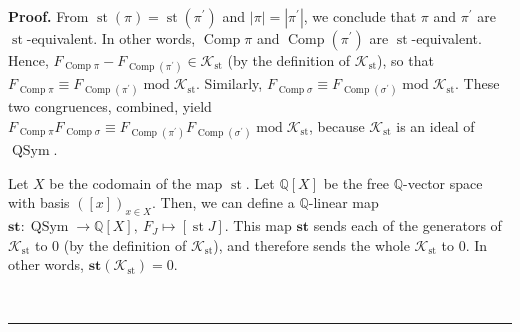\documentclass[numbers=enddot,12pt,final,onecolumn,notitlepage]{scrartcl}%
\theoremstyle{definition}
\newenvironment{proof}[1][Proof]{\noindent\textbf{#1.} }{\ \rule{0.5em}{0.5em}}
\newenvironment{verlong}{}{}
\begin{document}
\begin{verlong}
\begin{proof}
From $\operatorname*{st}\left(  \pi\right)  =\operatorname*{st}\left(
\pi^{\prime}\right)  $ and $\left\vert \pi\right\vert =\left\vert \pi^{\prime
}\right\vert $, we conclude that $\pi$ and $\pi^{\prime}$ are
$\operatorname*{st}$-equivalent. In other words, $\operatorname*{Comp}\pi$ and
$\operatorname*{Comp}\left(  \pi^{\prime}\right)  $ are $\operatorname*{st}%
$-equivalent. Hence, $F_{\operatorname*{Comp}\pi}-F_{\operatorname*{Comp}%
\left(  \pi^{\prime}\right)  }\in\mathcal{K}_{\operatorname*{st}}$ (by the
definition of $\mathcal{K}_{\operatorname*{st}}$), so that
$F_{\operatorname*{Comp}\pi}\equiv F_{\operatorname*{Comp}\left(  \pi^{\prime
}\right)  }\operatorname{mod}\mathcal{K}_{\operatorname*{st}}$. Similarly,
$F_{\operatorname*{Comp}\sigma}\equiv F_{\operatorname*{Comp}\left(
\sigma^{\prime}\right)  }\operatorname{mod}\mathcal{K}_{\operatorname*{st}}$.
These two congruences, combined, yield $F_{\operatorname*{Comp}\pi
}F_{\operatorname*{Comp}\sigma}\equiv F_{\operatorname*{Comp}\left(
\pi^{\prime}\right)  }F_{\operatorname*{Comp}\left(  \sigma^{\prime}\right)
}\operatorname{mod}\mathcal{K}_{\operatorname*{st}}$, because $\mathcal{K}%
_{\operatorname*{st}}$ is an ideal of $\operatorname*{QSym}$.

Let $X$ be the codomain of the map $\operatorname*{st}$. Let $\mathbb{Q}%
\left[  X\right]  $ be the free $\mathbb{Q}$-vector space with basis $\left(
\left[  x\right]  \right)  _{x\in X}$. Then, we can define a $\mathbb{Q}%
$-linear map $\mathbf{st}:\operatorname*{QSym}\rightarrow\mathbb{Q}\left[
X\right]  ,\ F_{J}\mapsto\left[  \operatorname*{st}J\right]  $. This map
$\mathbf{st}$ sends each of the generators of $\mathcal{K}_{\operatorname*{st}%
}$ to $0$ (by the definition of $\mathcal{K}_{\operatorname*{st}}$), and
therefore sends the whole $\mathcal{K}_{\operatorname*{st}}$ to $0$. In other
words, $\mathbf{st}\left(  \mathcal{K}_{\operatorname*{st}}\right)  =0$.


\end{proof}
\end{verlong}
\end{document}
